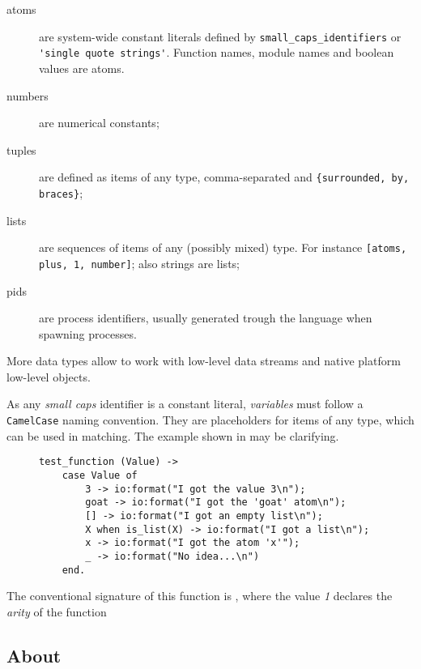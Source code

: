 \begin{description}

    \item[atoms] are system-wide constant literals defined by
        \lstinline{small_caps_identifiers} or
        \lstinline{'single quote strings'}. Function names, module
        names and boolean values are atoms.

    \item[numbers] are numerical constants;

    \item[tuples] are defined as items of any type, comma-separated and
        \lstinline|{surrounded, by, braces}|;

    \item[lists] are sequences of items of any (possibly mixed) type.
        For instance
        \lstinline{[atoms, plus, 1, number]}; also strings are lists;

    \item[pids] are process identifiers, usually generated trough the
        language  when spawning processes.

\end{description}

More data types allow to work with low-level data streams and native
platform low-level objects.

As any \emph{small caps} identifier is a constant literal,
\emph{variables} must follow a \lstinline{CamelCase} naming convention.
They are placeholders for items of any type, which can be used in
matching. The example shown in  may be clarifying.

\begin{figure}[hbt]
\begin{lstlisting}[caption={Example of \Erlang\ code},
                   label={code:Example}]
test_function (Value) ->
    case Value of
        3 -> io:format("I got the value 3\n");
        goat -> io:format("I got the 'goat' atom\n");
        [] -> io:format("I got an empty list\n");
        X when is_list(X) -> io:format("I got a list\n");
        x -> io:format("I got the atom 'x'");
        _ -> io:format("No idea...\n")
    end.
\end{lstlisting}
\end{figure}

The conventional signature of this function is ,
where the value \emph{1} declares the \emph{arity} of the function

\subsection{About \OTP}


